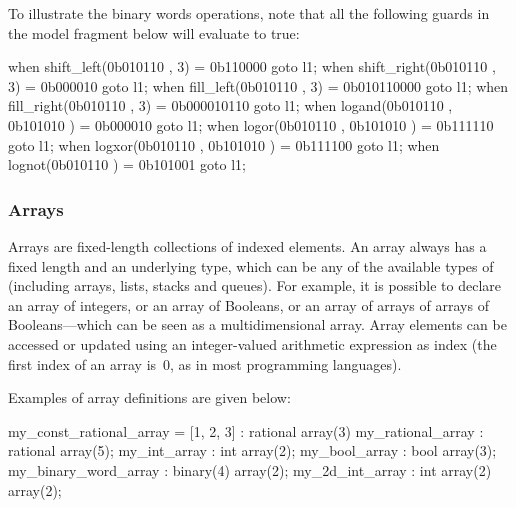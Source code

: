 \begin{example}
	To illustrate the binary words operations, note that all the following guards in the model fragment below will evaluate to true:

\begin{IMITATORmodel}
when shift_left(0b010110 , 3)     = 0b110000    goto l1;
when shift_right(0b010110 , 3)    = 0b000010    goto l1;
when fill_left(0b010110 , 3)      = 0b010110000 goto l1;
when fill_right(0b010110 , 3)     = 0b000010110 goto l1;
when logand(0b010110 , 0b101010 ) = 0b000010    goto l1;
when logor(0b010110 , 0b101010 )  = 0b111110    goto l1;
when logxor(0b010110 , 0b101010 ) = 0b111100    goto l1;
when lognot(0b010110 )            = 0b101001    goto l1;
\end{IMITATORmodel}

\end{example}


\subsubsection{Arrays}

Arrays are fixed-length collections of indexed elements.
An array always has a fixed length and an underlying type, which can be any of the available types of \imitator{} (including arrays, lists, stacks and queues).
For example, it is possible to declare an array of integers, or an array of Booleans, or an array of arrays of arrays of Booleans---which can be seen as a multidimensional array.
%
Array elements can be accessed or updated using an integer-valued arithmetic expression as index (the first index of an array is~0, as in most programming languages).

Examples of array definitions are given below:

\begin{IMITATORmodel}
	my_const_rational_array = [1, 2, 3] : rational array(3)
	my_rational_array    	: rational array(5);
	my_int_array         	: int array(2);
	my_bool_array        	: bool array(3);
	my_binary_word_array 	: binary(4) array(2);
	my_2d_int_array      	: int array(2) array(2);
\end{IMITATORmodel}

